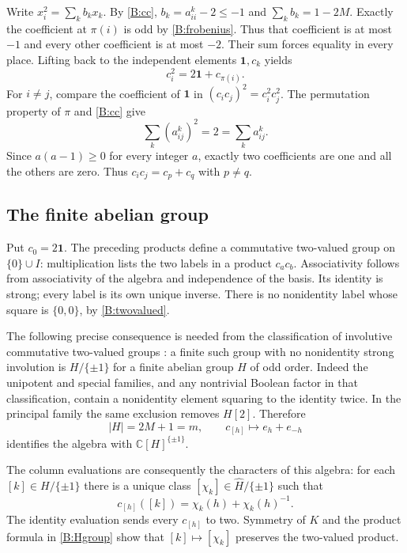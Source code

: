 \documentclass[11pt]{article}
\newcommand{\C}{\mathbb C}\newcommand{\Q}{\mathbb Q}\newcommand{\Z}{\mathbb Z}
\newcommand{\one}{\mathbf1}\newcommand{\D}{\mathcal D}\newcommand{\Dcat}{\mathcal D}
\numberwithin{equation}{section}
\begin{document}
Write $x_i^2=\sum_k b_kx_k$. By \eqref{B:cc}, $b_k=a_{ii}^k-2\leq-1$ and $\sum_kb_k=1-2M$. Exactly the coefficient at $\pi(i)$ is odd by \eqref{B:frobenius}. Thus that coefficient is at most $-1$ and every other coefficient is at most $-2$. Their sum forces equality in every place. Lifting back to the independent elements $\one,c_k$ yields
\begin{equation}\label{B:twovalued}
 c_i^2=2\one+c_{\pi(i)}.
\end{equation}
For $i\ne j$, compare the coefficient of $\one$ in $(c_ic_j)^2=c_i^2c_j^2$. The permutation property of $\pi$ and \eqref{B:cc} give
\[
 \sum_k(a_{ij}^k)^2=2=\sum_k a_{ij}^k.
\]
Since $a(a-1)\geq0$ for every integer $a$, exactly two coefficients are one and all the others are zero. Thus $c_ic_j=c_p+c_q$ with $p\ne q$.

\subsection{The finite abelian group}
Put $c_0=2\one$. The preceding products define a commutative two-valued group on $\{0\}\cup I$: multiplication lists the two labels in a product $c_ac_b$. Associativity follows from associativity of the algebra and independence of the basis. Its identity is strong; every label is its own unique inverse. There is no nonidentity label whose square is $\{0,0\}$, by \eqref{B:twovalued}.

The following precise consequence is needed from the classification of involutive commutative two-valued groups \cite[Theorem 1.10]{B:BVG}: a finite such group with no nonidentity strong involution is $H/\{\pm1\}$ for a finite abelian group $H$ of odd order. Indeed the unipotent and special families, and any nontrivial Boolean factor in that classification, contain a nonidentity element squaring to the identity twice. In the principal family the same exclusion removes $H[2]$. Therefore
\begin{equation}\label{B:Hgroup}
 |H|=2M+1=m,\qquad
 c_{[h]}\longmapsto e_h+e_{-h}
\end{equation}
identifies the algebra with $\C[H]^{\{\pm1\}}$.

The column evaluations are consequently the characters of this algebra: for each $[k]\in H/\{\pm1\}$ there is a unique class $[\chi_k]\in\widehat H/\{\pm1\}$ such that
\[
 c_{[h]}([k])=\chi_k(h)+\chi_k(h)^{-1}.
\]
The identity evaluation sends every $c_{[h]}$ to two. Symmetry of $K$ and the product formula in \eqref{B:Hgroup} show that $[k]\mapsto[\chi_k]$ preserves the two-valued product.
\end{document}
